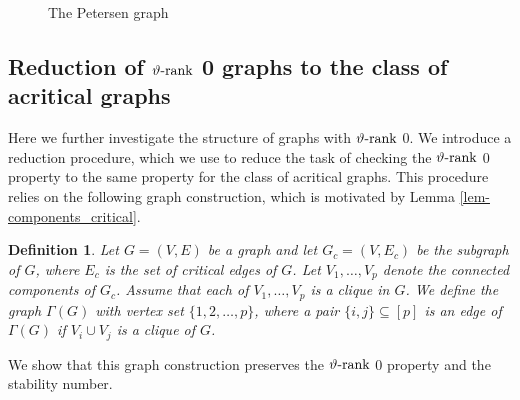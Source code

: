 \documentclass[11pt]{article}
\newtheorem{definition}[theorem]{Definition}
\numberwithin{equation}{section}
\newcommand{\rrank}{\vartheta\text{\rm -rank}}
\begin{document}
{\begin{figure}[H]
\caption{The Petersen graph}\label{fig-Petersen}
\end{figure}
}




\subsection{Reduction of $\rrank$ 0 graphs to the class of acritical graphs}

Here we further investigate  the structure of graphs with $\rrank$ 0. We introduce a reduction procedure, which we use  to reduce the task of checking the $\rrank$ 0 property to the same property for the class of acritical graphs. This procedure relies on  the following graph construction, which is motivated by Lemma \ref{lem-components_critical}.%

\begin{definition}\label{def-Gamma}
Let $G=(V,E)$ be a graph and %
let $G_c=(V,E_c)$ be the subgraph of $G$, where $E_c$ is the set of critical edges of $G$. Let  $V_1,\dots, V_p$ denote the connected components of $G_c$.
Assume that  each of $V_1,\ldots,V_p$ is a clique in $G$. We  define the graph $\Gamma(G)$ with vertex set $\{1,2,\dots, p\}$,
 where a pair $\{i,j\}\subseteq [p]$ is an edge of $\Gamma(G)$ if $V_i\cup V_j$ is a clique of $G$. 
\end{definition}

We show that  this graph construction preserves the $\rrank$ 0 property and the stability number.
\end{document}
